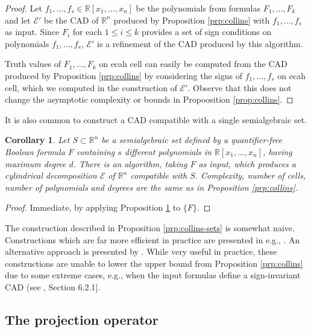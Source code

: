 \documentclass[
]{book}
\newtheorem{corollary}{Corollary}[chapter]
\theoremstyle{definition}
\theoremstyle{definition}
\theoremstyle{definition}
\theoremstyle{definition}
\theoremstyle{remark}
\begin{document}
\begin{proof}
Let \(f_1,\ldots,f_s \in \mathbb{R}[x_1,\ldots,x_n]\) be the polynomials from formulas \(F_1,\ldots,F_k\) and let \(\mathcal{E}'\) be the CAD of \(\mathbb{R}^n\) produced by Proposition \ref{prp:collins} with \(f_1,\ldots,f_s\) as input. Since \(F_i\) for each \(1\le i\le k\) provides a set of sign conditions on polynomials \(f_1,\ldots,f_s\), \(\mathcal{E}'\) is a refinement of the CAD produced by this algorithm.

Truth values of \(F_1,\ldots,F_k\) on ecah cell can easily be computed from the CAD produced by Proposition \ref{prp:collins} by considering the signs of \(f_1,\ldots,f_s\) on ecah cell, which we computed in the construction of \(\mathcal{E}'\).
Observe that this does not change the asymptotic complexity or bounds in Propoosition \ref{prop:collins}.
\end{proof}

It is also common to construct a CAD compatible with a single semialgebraic set.

\begin{corollary}
\protect\hypertarget{cor:collins-set}{}\label{cor:collins-set}Let \(S\subset \mathbb{R}^n\) be a semialgebraic set defined by a quantifier-free Boolean formula \(F\) containing \(s\) different polynomials in \(\mathbb{R}[x_1,\ldots,x_n]\), having maximum degree \(d\).
There is an algorithm, taking \(F\) as input, which produces a cylindrical decomposition \(\mathcal E\) of \(\mathbb{R}^n\) compatible with \(S\).
Complexity, number of cells, number of polynomials and degrees are the same as in Proposition \ref{prp:collins}.
\end{corollary}

\begin{proof}
Immediate, by applying Proposition \ref{cor:collins-set} to \(\{ F \}\).
\end{proof}

The construction described in Proposition \ref{prp:collins-sets} is somewhat naive.
Constructions which are far more efficient in practice are presented in e.g., \citet{collins1991}. An alternative approach is presented by \citet{bradford2014}.
While very useful in practice, these constructions are unable to lower the upper bound from Proposition \ref{prp:collins} due to some extreme cases, e.g., when the input formulas define a sign-invariant CAD (see \citet{bradford2014}, Section 6.2.1{]}.

\hypertarget{the-projection-operator}{%
\subsection{The projection operator}\label{the-projection-operator}}
\end{document}
